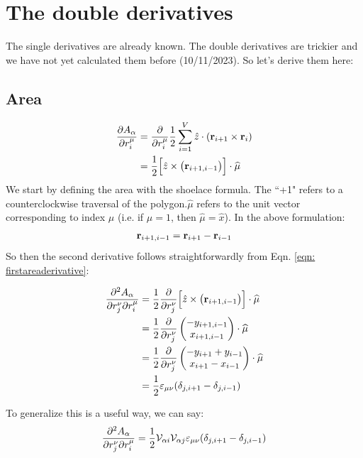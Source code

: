 \documentclass[12pt,a4paper]{article}
\begin{document}
\section{The double derivatives}

The single derivatives are already known. The double derivatives are trickier and we have not yet calculated them before (10/11/2023). So let's derive them here:

\subsection{Area}

\begin{align}
	\label{eqn: firstareaderivative}
	\pdv{A_\alpha}{r_i^\mu} &= \pdv{r_i^\mu} \frac{1}{2} \sum\limits_{i=1}^V \hat{z}\cdot(\vb{r}_{i+1} \times \vb{r}_i)\\
	&= \frac{1}{2} \Big[\hat{z} \times  \big(\vb{r}_{i+1, i-1}\big)\Big]\cdot\widehat{\mu}
\end{align}
We start by defining the area with the shoelace formula. The ``+1" refers to a counterclockwise traversal of the polygon.$\widehat{\mu}$ refers to the unit vector corresponding to index $\mu$ (i.e. if $\mu = 1$, then $\widehat{\mu} = \hat{x}$).  In the above formulation:
\begin{align}
	\vb{r}_{i+1,i-1} = \vb{r}_{i+1} - \vb{r}_{i-1}
\end{align}
So then the second derivative follows straightforwardly from Eqn. \ref{eqn: firstareaderivative}:

\begin{align}
	\label{eqn: secondareaderivative}
	\pdv[2]{A_\alpha}{r_j^\nu}{r_i^\mu} &= \frac{1}{2}\pdv{r_j^\nu} \Big[\hat{z} \times  \big(\vb{r}_{i+1, i-1}\big)\Big]\cdot\widehat{\mu}\\
	&= \frac{1}{2}\pdv{r_j^\nu}
	\begin{pmatrix}
	-y_{i+1, i-1}\\
	x_{i+1,i-1}
	\end{pmatrix}\cdot\widehat{\mu}\\
	&= \frac{1}{2}\pdv{r_j^\nu}
	\begin{pmatrix}
	-y_{i+1} + y_{i-1}\\
	x_{i+1} - x_{i-1}
	\end{pmatrix}\cdot\widehat{\mu}\\
	&=\frac{1}{2} \varepsilon_{\mu\nu} (\delta_{j,i+1}-\delta_{j,i-1})
\end{align}

To generalize this is a useful way, we can say:
\begin{equation}
	\label{eqn: generalsecondareaderivative}
	\pdv[2]{A_\alpha}{r_j^\nu}{r_i^\mu} = \frac{1}{2}\mathcal{V}_{\alpha i} \mathcal{V}_{\alpha j} \varepsilon_{\mu \nu  } (\delta_{j,i+1}-\delta_{j,i-1})
\end{equation}
\end{document}

